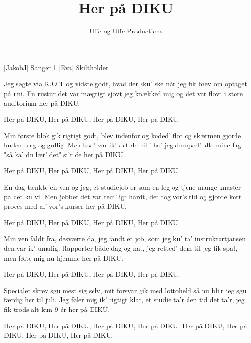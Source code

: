 \documentclass[a4paper,11pt]{article}
\title{Her på DIKU}
\author{Uffe og Uffe Productions}
\begin{document}
\maketitle

\begin{roles}
[JakobJ] Sanger 1
[Eva] Skiltholder
\end{roles}

\begin{props}
\end{props}

  
\begin{song}

Jeg søgte via K.O.T
og vidste godt, hvad der sku' ske
når jeg fik brev om optaget på uni.
En rustur det var mægtigt sjovt
jeg knækked mig og det var flovt
i store auditorium her på DIKU.

Her på DIKU, Her på DIKU, Her på DIKU, Her på DIKU.


Min første blok gik rigtigt godt,
blev indenfor og koded' flot
og skærmen gjorde huden bleg og gullig.
Men kod' var ik' det de vill' ha'
jeg dumped' alle mine fag
"så ka' du lær' det" si'r de her på DIKU.

Her på DIKU, Her på DIKU, Her på DIKU, Her på DIKU.


En dag tænkte en ven og jeg,
et studiejob er som en leg
og tjene mange knaster på det ku vi.
Men jobbet det var tem'ligt hårdt,
det tog vor's tid og gjorde kort
proces med al' vor's kurser her på DIKU.

Her på DIKU, Her på DIKU, Her på DIKU, Her på DIKU.


Min ven faldt fra, desværre da,
jeg fandt et job, som jeg ku' ta'
instruktortjansen den var ik' umulig.
Rapporter både dag og nat,
jeg retted' dem til jeg fik spat,
men følte mig nu hjemme her på DIKU.

Her på DIKU, Her på DIKU, Her på DIKU, Her på DIKU.


Specialet skrev sgu mest sig selv,
mit forsvar gik med lottoheld
så nu bli'r jeg sgu færdig her til juli.
Jeg føler mig ik' rigtigt klar,
et studie ta'r den tid det ta'r,
jeg fik trods alt kun 9 år her på DIKU.

Her på DIKU, Her på DIKU, Her på DIKU, Her på DIKU. 
Her på DIKU, Her på DIKU, Her på DIKU, Her på DIKU.



\end{song}
\end{document}
